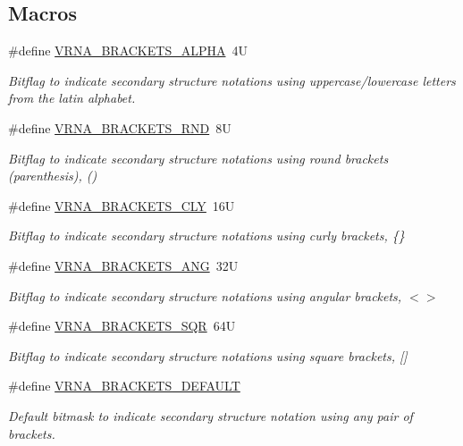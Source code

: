 \subsection*{Macros}
\begin{DoxyCompactItemize}
\item 
\#define \hyperlink{group__struct__utils__dot__bracket_ga7e3f630af8d69bb0e917145aacf2f96d}{V\+R\+N\+A\+\_\+\+B\+R\+A\+C\+K\+E\+T\+S\+\_\+\+A\+L\+P\+HA}~4U
\begin{DoxyCompactList}\small\item\em Bitflag to indicate secondary structure notations using uppercase/lowercase letters from the latin alphabet. \end{DoxyCompactList}\item 
\#define \hyperlink{group__struct__utils__dot__bracket_gac92d5fa7c6625bce2670ece510a24fbd}{V\+R\+N\+A\+\_\+\+B\+R\+A\+C\+K\+E\+T\+S\+\_\+\+R\+ND}~8U
\begin{DoxyCompactList}\small\item\em Bitflag to indicate secondary structure notations using round brackets (parenthesis), {\ttfamily ()} \end{DoxyCompactList}\item 
\#define \hyperlink{group__struct__utils__dot__bracket_gaf41be40e79cb756c4e0bb8edb4d803d2}{V\+R\+N\+A\+\_\+\+B\+R\+A\+C\+K\+E\+T\+S\+\_\+\+C\+LY}~16U
\begin{DoxyCompactList}\small\item\em Bitflag to indicate secondary structure notations using curly brackets, {\ttfamily \{\}} \end{DoxyCompactList}\item 
\#define \hyperlink{group__struct__utils__dot__bracket_ga863e03f7f73f10fc9bbcbefbdda4bec8}{V\+R\+N\+A\+\_\+\+B\+R\+A\+C\+K\+E\+T\+S\+\_\+\+A\+NG}~32U
\begin{DoxyCompactList}\small\item\em Bitflag to indicate secondary structure notations using angular brackets, {\ttfamily $<$$>$} \end{DoxyCompactList}\item 
\#define \hyperlink{group__struct__utils__dot__bracket_ga60525d61d7496eeea490a37f3d6bf757}{V\+R\+N\+A\+\_\+\+B\+R\+A\+C\+K\+E\+T\+S\+\_\+\+S\+QR}~64U
\begin{DoxyCompactList}\small\item\em Bitflag to indicate secondary structure notations using square brackets, {\ttfamily \mbox{[}\mbox{]}} \end{DoxyCompactList}\item 
\#define \hyperlink{group__struct__utils__dot__bracket_ga559ebf76b1b289f85309f4206e99aa1a}{V\+R\+N\+A\+\_\+\+B\+R\+A\+C\+K\+E\+T\+S\+\_\+\+D\+E\+F\+A\+U\+LT}
\begin{DoxyCompactList}\small\item\em Default bitmask to indicate secondary structure notation using any pair of brackets. \end{DoxyCompactList}\end{DoxyCompactItemize}
